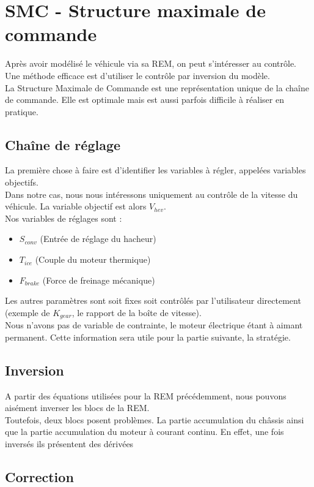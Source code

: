 \section{SMC - Structure maximale de commande}
Après avoir modélisé le véhicule via sa REM, on peut s'intéresser au contrôle. Une méthode efficace est d'utiliser le contrôle par inversion du modèle.\\

La Structure Maximale de Commande est une représentation unique de la chaîne de commande. Elle est optimale mais est aussi parfois difficile à réaliser en pratique.\\

\subsection{Chaîne de réglage}
La première chose à faire est d'identifier les variables à régler, appelées variables objectifs.\\
Dans notre cas, nous nous intéressons uniquement au contrôle de la vitesse du véhicule. La variable objectif est alors $V_{hev}$.\\

Nos variables de réglages sont : 
\begin{itemize}
\item $S_{conv}$ (Entrée de réglage du hacheur)
\item $T_{ice}$ (Couple du moteur thermique)
\item $F_{brake}$ (Force de freinage mécanique)
\end{itemize}

Les autres paramètres sont soit fixes soit contrôlés par l'utilisateur directement (exemple de $K_{gear}$, le rapport de la boîte de vitesse).\\

Nous n'avons pas de variable de contrainte, le moteur électrique étant à aimant permanent. Cette information sera utile pour la partie suivante, la stratégie.\\


\subsection{Inversion}
A partir des équations utilisées pour la REM précédemment, nous pouvons aisément inverser les blocs de la REM.\\


Toutefois, deux blocs posent problèmes. La partie accumulation du châssis ainsi que la partie accumulation du moteur à courant continu. En effet, une fois inversés ils présentent des dérivées 

\subsection{Correction}